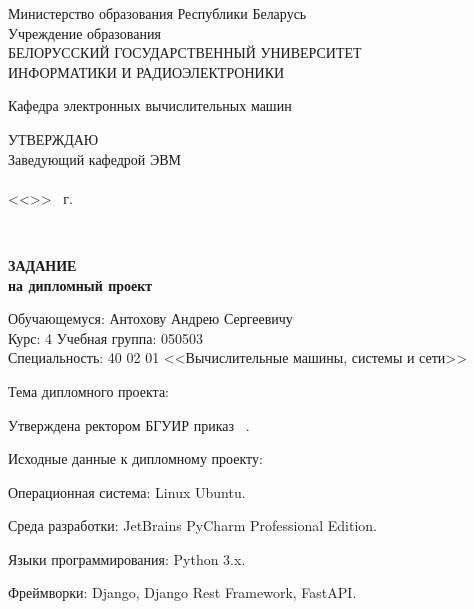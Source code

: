     \begin{center}
      Министерство образования Республики Беларусь\\[1em]
      Учреждение образования\\
      БЕЛОРУССКИЙ ГОСУДАРСТВЕННЫЙ УНИВЕРСИТЕТ \\
      ИНФОРМАТИКИ И РАДИОЭЛЕКТРОНИКИ\\[1em]
    \end{center}

    \begin{center}
      Кафедра электронных вычислительных машин
    \end{center}

    \begin{flushright}
      \begin{minipage}{0.4\textwidth}
        \MakeUppercase{Утверждаю}\\
        Заведующий кафедрой ЭВМ\\
        \underline{\hspace*{2.2cm}} \headOfDepartmentShort \\
        <<\underline{\hspace*{1cm}}>> \underline{\hspace*{2.5cm}} \targetYear\ г.
      \end{minipage}\\[1em]
    \end{flushright}

    \begin{center}
      \textbf{ЗАДАНИЕ}\\
      \textbf{на дипломный проект}\\[1em]
    \end{center}

    \noindent
    Обучающемуся: Антохову Андрею Сергеевичу \\
    Курс: 4 \hspace*{2ex} Учебная группа: 050503 \\
    Специальность: 40 02 01 <<Вычислительные машины, системы и сети>>

    \vspace{1em}
    \noindent
    Тема дипломного проекта: \taskNameFull

    \vspace{1em}
    \noindent
    Утверждена ректором БГУИР \uniDecreeDate приказ \textnumero \ \uniDecreeNumber.

    \vspace{1em}
    \noindent
    Исходные данные к дипломному проекту:
    \begin{enumerate_numx}
      \item Операционная система: Linux Ubuntu.
      \item Среда разработки: JetBrains PyCharm Professional Edition.
      \item Языки программирования: Python 3.x.
      \item Фреймворки: Django, Django Rest Framework, FastAPI.
    \end{enumerate_numx}

